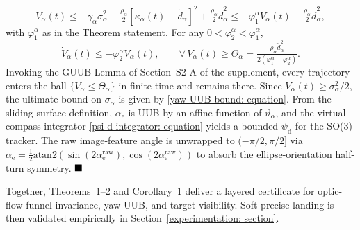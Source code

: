 {\begin{equation}
\dot{V}_\alpha(t) \le -\gamma_\alpha\sigma_\alpha^2 - \tfrac{\rho_\alpha}{2}[\kappa_\alpha(t)-\tilde{d}_\alpha]^2 + \tfrac{\rho_\alpha}{2}\tilde{d}_\alpha^2 \le -\varphi_1^\alpha V_\alpha(t) + \tfrac{\rho_\alpha}{2}\tilde{d}_\alpha^2,
\end{equation}
with $\varphi_1^\alpha$ as in the Theorem statement. For any $0<\varphi_2^\alpha<\varphi_1^\alpha$,
\begin{equation*}
\dot{V}_\alpha(t)\le -\varphi_2^\alpha V_\alpha(t),\qquad \forall\,V_\alpha(t)\ge\Theta_\alpha = \tfrac{\rho_\alpha\tilde{d}_\alpha^2}{2(\varphi_1^\alpha-\varphi_2^\alpha)}.
\end{equation*}
Invoking the GUUB Lemma of Section~S2-A of the supplement, every trajectory enters the ball $\{V_\alpha\le\Theta_\alpha\}$ in finite time and remains there. Since $V_\alpha(t)\ge\sigma_\alpha^2/2$, the ultimate bound on $\sigma_\alpha$ is given by \eqref{yaw UUB bound: equation}. From the sliding-surface definition, $\alpha_\text{e}$ is UUB by an affine function of $\vartheta_\alpha$, and the virtual-compass integrator \eqref{psi d integrator: equation} yields a bounded $\psi_\text{d}$ for the SO(3) tracker. The raw image-feature angle is unwrapped to $(-\pi/2,\pi/2]$ via $\alpha_\text{e} = \tfrac12\text{atan2}(\sin(2\alpha_\text{e}^\text{raw}),\cos(2\alpha_\text{e}^\text{raw}))$ to absorb the ellipse-orientation half-turn symmetry. $\hfill\blacksquare$}

Together, Theorems~1--2 and Corollary~1 deliver a layered certificate for optic-flow funnel invariance, yaw UUB, and target visibility. Soft-precise landing is then validated empirically in Section~\ref{experimentation: section}.


